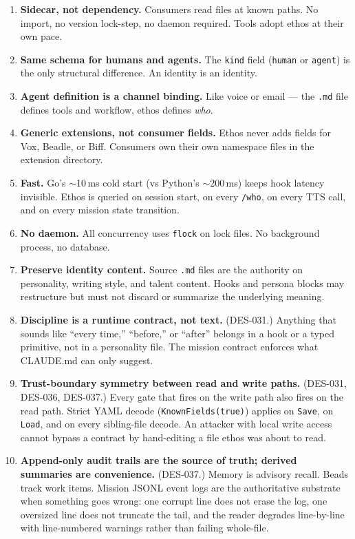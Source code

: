 \documentclass[a4paper,10pt]{article}
\newcommand{\field}[1]{\texttt{#1}}
\newcommand{\cmd}[1]{\texttt{#1}}
\begin{document}
\begin{enumerate}[label=\textbf{P\arabic*}.]
  \item \textbf{Sidecar, not dependency.}  Consumers read files at
    known paths.  No import, no version lock-step, no daemon required.
    Tools adopt ethos at their own pace.
  \item \textbf{Same schema for humans and agents.}  The \field{kind}
    field (\texttt{human} or \texttt{agent}) is the only structural
    difference.  An identity is an identity.
  \item \textbf{Agent definition is a channel binding.}  Like voice
    or email --- the \texttt{.md} file defines tools and workflow,
    ethos defines \emph{who}.
  \item \textbf{Generic extensions, not consumer fields.}  Ethos
    never adds fields for Vox, Beadle, or Biff.  Consumers own their
    own namespace files in the extension directory.
  \item \textbf{Fast.}  Go's $\sim$10\,ms cold start (vs Python's
    $\sim$200\,ms) keeps hook latency invisible.  Ethos is queried on
    session start, on every \cmd{/who}, on every TTS call, and on
    every mission state transition.
  \item \textbf{No daemon.}  All concurrency uses \texttt{flock}
    on lock files.  No background process, no database.
  \item \textbf{Preserve identity content.}  Source \texttt{.md}
    files are the authority on personality, writing style, and talent
    content.  Hooks and persona blocks may restructure but must not
    discard or summarize the underlying meaning.
  \item \textbf{Discipline is a runtime contract, not text.}
    (DES-031.)  Anything that sounds like ``every time,'' ``before,''
    or ``after'' belongs in a hook or a typed primitive, not in a
    personality file.  The mission contract enforces what CLAUDE.md
    can only suggest.
  \item \textbf{Trust-boundary symmetry between read and write paths.}
    (DES-031, DES-036, DES-037.)  Every gate that fires on the write
    path also fires on the read path.  Strict YAML decode
    (\texttt{KnownFields(true)}) applies on \texttt{Save}, on
    \texttt{Load}, and on every sibling-file decode.  An attacker
    with local write access cannot bypass a contract by hand-editing
    a file ethos was about to read.
  \item \textbf{Append-only audit trails are the source of truth;
    derived summaries are convenience.}  (DES-037.)  Memory is
    advisory recall.  Beads track work items.  Mission JSONL event
    logs are the authoritative substrate when something goes wrong:
    one corrupt line does not erase the log, one oversized line does
    not truncate the tail, and the reader degrades line-by-line with
    line-numbered warnings rather than failing whole-file.
\end{enumerate}
\end{document}
